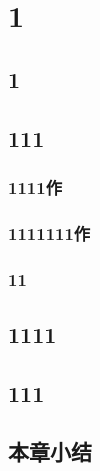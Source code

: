 
\chapter{1}

\section{1}

\section{111}

\subsection{1111作}

\subsection{1111111作} %

\subsection{11}

\section{1111}

\section{111}


\section{本章小结}
